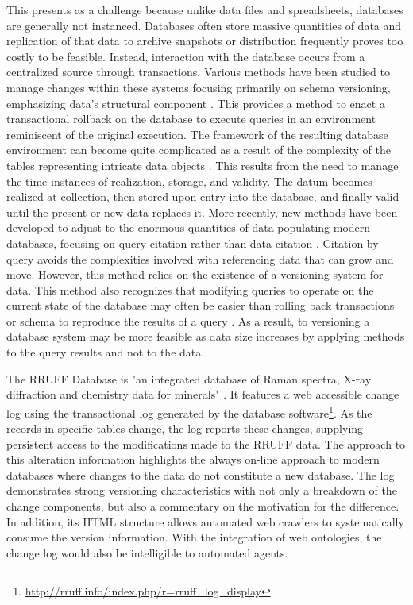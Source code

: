 This presents as a challenge because unlike data files and spreadsheets, databases are generally not instanced.
Databases often store massive quantities of data and replication of that data to archive snapshots or distribution frequently proves too costly to be feasible.
Instead, interaction with the database occurs from a centralized source through transactions.
Various methods have been studied to manage changes within these systems focusing primarily on schema versioning, emphasizing data's structural component \cite{roddick1996model}.
This provides a method to enact a transactional rollback on the database to execute queries in an environment reminiscent of the original execution.
The framework of the resulting database environment can become quite complicated as a result of the complexity of the tables representing intricate data objects \cite{Klahold:1986:GMV:645913.671314}.
This results from the need to manage the time instances of realization, storage, and validity.
The datum becomes realized at collection, then stored upon entry into the database, and finally valid until the present or new data replaces it.
More recently, new methods have been developed to adjust to the enormous quantities of data populating modern databases, focusing on query citation rather than data citation \cite{Proell2013} \cite{DBLP:conf/data/2013}.
Citation by query avoids the complexities involved with referencing data that can grow and move.
However, this method relies on the existence of a versioning system for data.
This method also recognizes that modifying queries to operate on the current state of the database may often be easier than rolling back transactions or schema to reproduce the results of a query \cite{proellBigData}.
As a result, to versioning a database system may be more feasible as data size increases by applying methods to the query results and not to the data.

The RRUFF Database is "an integrated database of Raman spectra, X-ray diffraction and chemistry data for minerals" \cite{Lafuente}.
It features a web accessible change log using the transactional log generated by the database software\footnote{\url{http://rruff.info/index.php/r=rruff_log_display}}.
As the records in specific tables change, the log reports these changes, supplying persistent access to the modifications made to the RRUFF data.
The approach to this alteration information highlights the always on-line approach to modern databases where changes to the data do not constitute a new database.
The log demonstrates strong versioning characteristics with not only a breakdown of the change components, but also a commentary on the motivation for the difference.
In addition, its HTML structure allows automated web crawlers to systematically consume the version information.
With the integration of web ontologies, the change log would also be intelligible to automated agents.

